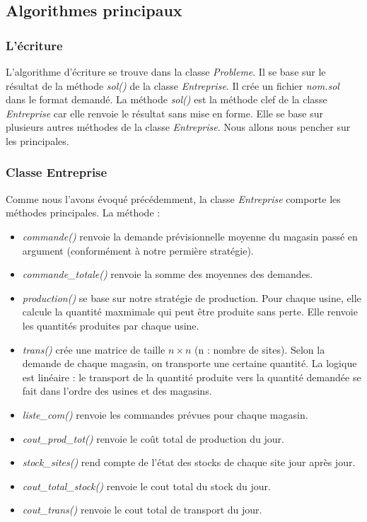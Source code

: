 \documentclass[12pt, a4paper]{article}
\begin{document}
\subsection{Algorithmes principaux}

\subsubsection{L'écriture}
L'algorithme d'écriture se trouve dans la classe \emph{Probleme}. Il se base sur le résultat de la méthode \emph{sol()} de la classe \emph{Entreprise}. Il crée un fichier \emph{nom.sol} dans le format demandé. La méthode \emph{sol()} est la méthode clef de la classe \emph{Entreprise} car elle renvoie le résultat sans mise en forme. Elle se base sur plusieurs autres méthodes de la classe \emph{Entreprise}. Nous allons nous pencher sur les principales.

\subsubsection{Classe Entreprise}
Comme nous l'avons évoqué précédemment, la classe \emph{Entreprise} comporte les méthodes principales.
La méthode :
\begin{itemize}
\item \emph{commande()} renvoie la demande prévisionnelle moyenne du magasin passé en argument (conformément à notre permière stratégie).
\item \emph{commande\_totale()} renvoie la somme des moyennes des demandes.
\item \emph{production()} se base sur notre stratégie de production. Pour chaque usine, elle calcule la quantité maxmimale qui peut être produite sans perte. Elle renvoie les quantités produites par chaque usine.
\item \emph{trans()} crée une matrice de taille $n\times n$ (n : nombre de sites). Selon la demande de chaque magasin, on transporte une certaine quantité. La logique est linéaire : le transport de la quantité produite vers la quantité demandée se fait dans l'ordre des usines et des magasins.
\item \emph{liste\_com()} renvoie les commandes prévues pour chaque magasin.
\item \emph{cout\_prod\_tot()} renvoie le coût total de production du jour.
\item \emph{stock\_sites()} rend compte de l'état des stocks de chaque site jour après jour.
\item \emph{cout\_total\_stock()} renvoie le cout total du stock du jour.
\item\emph{cout\_trans()} renvoie le cout total de transport du jour.
\end{itemize}
\end{document}
